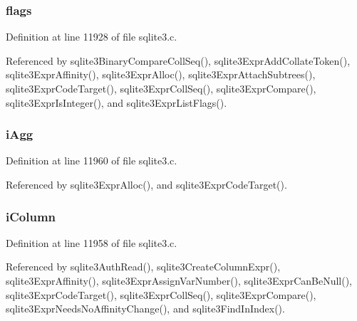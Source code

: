 \hypertarget{struct_expr_a9fb2abd9f2594cefc48d6856e01f2879}{}
\subsubsection[{flags}]{ flags}\label{struct_expr_a9fb2abd9f2594cefc48d6856e01f2879}


Definition at line 11928 of file sqlite3.\+c.



Referenced by sqlite3\+Binary\+Compare\+Coll\+Seq(), sqlite3\+Expr\+Add\+Collate\+Token(), sqlite3\+Expr\+Affinity(), sqlite3\+Expr\+Alloc(), sqlite3\+Expr\+Attach\+Subtrees(), sqlite3\+Expr\+Code\+Target(), sqlite3\+Expr\+Coll\+Seq(), sqlite3\+Expr\+Compare(), sqlite3\+Expr\+Is\+Integer(), and sqlite3\+Expr\+List\+Flags().

\hypertarget{struct_expr_a5ceb8e3b2fe3e0122f95171c07ff629f}{}
\subsubsection[{i\+Agg}]{ i\+Agg}\label{struct_expr_a5ceb8e3b2fe3e0122f95171c07ff629f}


Definition at line 11960 of file sqlite3.\+c.



Referenced by sqlite3\+Expr\+Alloc(), and sqlite3\+Expr\+Code\+Target().

\hypertarget{struct_expr_a3b836549d2b76a569c649c3c4b5869ac}{}
\subsubsection[{i\+Column}]{ i\+Column}\label{struct_expr_a3b836549d2b76a569c649c3c4b5869ac}


Definition at line 11958 of file sqlite3.\+c.



Referenced by sqlite3\+Auth\+Read(), sqlite3\+Create\+Column\+Expr(), sqlite3\+Expr\+Affinity(), sqlite3\+Expr\+Assign\+Var\+Number(), sqlite3\+Expr\+Can\+Be\+Null(), sqlite3\+Expr\+Code\+Target(), sqlite3\+Expr\+Coll\+Seq(), sqlite3\+Expr\+Compare(), sqlite3\+Expr\+Needs\+No\+Affinity\+Change(), and sqlite3\+Find\+In\+Index().

